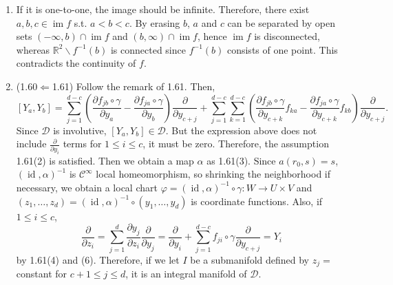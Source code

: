 \begin{enumerate}
thus by the compactness of $M$, $\exists t_{0}>0$ s.t. $\mathcal{D}_{t_{0}}=\mathcal{D}_{-t_{0}}=M$. 
Thus by 1.48(g), $X_{t_{0}}$ is an endomorphism, and $\forall n \in \mathbb{N}$, $X_{t_{0}}^{n}$ is defined on all of $M$. 
Therefore by 1.48(h), $\forall N>0, \mathcal{D}_{N}=M$. 
Likewise, $\forall N<0, \mathcal{D}_{N}=M$. 
Since it is clear that $D_{0}=M$, $\mathrm{M}$ is complete.
\item If it is one-to-one, the image should be infinite. 
Therefore, there exist $a, b, c \in \operatorname{im}f$ s.t. $a<b<c$. 
By erasing $b$, $a$ and $c$ can be separated by open sets $(-\infty, b) \cap \operatorname{im}f$ and $(b, \infty) \cap \operatorname{im}f$, 
hence $\operatorname{im}f$ is disconnected, whereas $\mathbb{R}^{2} \backslash f^{-1}(b)$ is connected since $f^{-1}(b)$ consists of one point. 
This contradicts the continuity of $f$.
\item (1.60$\Leftarrow$1.61) Follow the remark of 1.61. Then,
$$\left[Y_{a}, Y_{b}\right]=\sum_{j=1}^{d-c}\left(\frac{\partial f_{j b} \circ \gamma}{\partial y_{a}}-\frac{\partial f_{ja} \circ \gamma}{\partial y_{b}}\right) \frac{\partial}{\partial y_{c+j}}
+\sum_{j=1}^{d-c} \sum_{k=1}^{d-c}\left(\frac{\partial f_{jb} \circ \gamma}{\partial y_{c+k}} f_{k a}-\frac{\partial f_{j a} \circ \gamma}{\partial y_{c+k}} f_{k b}\right) \frac{\partial}{\partial y_{c+j}}.$$
Since $\mathcal{D}$ is involutive, $\left[Y_{a}, Y_{b}\right] \in \mathcal{D}$. But the expression above does not include $\frac{\partial}{\partial y_{i}}$ terms for $1 \leq i \leq c$, it must be zero. 
Therefore, the assumption 1.61(2) is satisfied. 
Then we obtain a map $\alpha$ as 1.61(3). 
Since $a(r_{0}, s)=s$, $(\operatorname{id}, \alpha)^{-1}$ is $\mathcal{C}^{\infty}$ local homeomorphism, 
so shrinking the neighborhood if necessary, we obtain a local chart $\varphi=(\operatorname{id}, \alpha)^{-1} \circ \gamma\colon W \rightarrow U \times V$ and $\left(z_{1}, \ldots, z_{d}\right)=(\operatorname{id}, \alpha)^{-1} \circ\left(y_{1}, \ldots, y_{d}\right)$ is coordinate functions. 
Also, if $1 \leq i \leq c$, 
\[\frac{\partial}{\partial z_{i}}=\sum_{j=1}^{d} \frac{\partial y_{j}}{\partial z_{i}} \frac{\partial}{\partial y_{j}}
=\frac{\partial}{\partial y_{i}}+\sum_{j=1}^{d-c} f_{ji} \circ \gamma \frac{\partial}{\partial y_{c+j}}=Y_{i}\]
by 1.61(4) and (6). 
Therefore, if we let $I$ be a submanifold defined by $z_{j}=$ constant for $c+1 \leq j \leq d$, it is an integral manifold of $\mathcal{D}$.


\end{enumerate}
